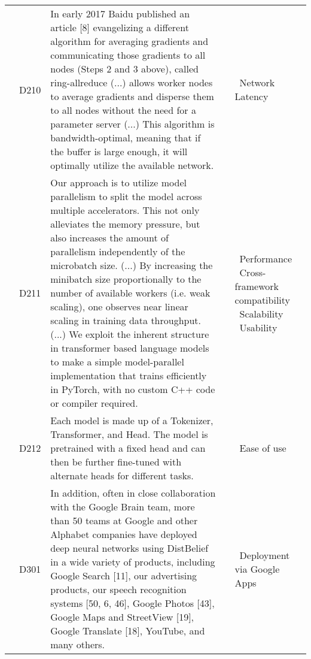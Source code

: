 {\begin{longtable}[H]{|l|p{0.6cm}|p{11.8cm}|p{0.6cm}|p{2cm}|}
         & \label{D210}D210\newline\centering\cite{sergeev_horovod_2018} & In early 2017 Baidu published an article [8] evangelizing a different algorithm for averaging gradients and communicating those gradients to all nodes (Steps 2 and 3 above), called ring-allreduce (...) allows worker nodes to average gradients and disperse them to all nodes without the need for a parameter server (...)  This algorithm is bandwidth-optimal, meaning that if the buffer is large enough, it will optimally utilize the available network.
         & \cite{sergeev_horovod_2018,li_colossal-ai_2023}
	     & \textbullet\ Network Latency \\ \cline{2-5}

         & \label{D211}D211\newline\centering\cite{shoeybi_megatron-lm_2020} & Our approach is to utilize model parallelism to split the model across multiple accelerators. This not only alleviates the memory pressure, but also increases the amount of parallelism independently of the microbatch size. (...) By increasing the minibatch size proportionally to the number of available workers (i.e. weak scaling), one observes near linear scaling in training data throughput. (...) We exploit the inherent structure in transformer based language models to make a simple model-parallel implementation that trains efficiently in PyTorch, with no custom C++ code or compiler required.
         & \cite{shoeybi_megatron-lm_2020,rasley_deepspeed_2020}
	     & \textbullet\ Performance \newline \textbullet\ Cross-framework compatibility \newline \textbullet\ Scalability \newline \textbullet\ Usability \\ \cline{2-5}
         
         & \label{D212}D212\newline\centering\cite{wolf_huggingfaces_2020} & Each model is made up of a Tokenizer, Transformer, and Head. The model is pretrained with a fixed head and can then be further fine-tuned with alternate heads for different tasks.
         & \cite{wolf_huggingfaces_2020,rasley_deepspeed_2020,shoeybi_megatron-lm_2020}
	     & \textbullet\ Ease of use \\ \hline



         & \label{D301}D301\newline\centering\cite{abadi_tensorflow_2016} & In addition, often in close collaboration with the Google Brain team, more than 50 teams at Google and other Alphabet companies have deployed deep neural networks using DistBelief in a wide variety of products, including Google Search [11], our advertising products, our speech recognition systems [50, 6, 46], Google Photos [43], Google Maps and StreetView [19], Google Translate [18], YouTube, and many others.
         & \cite{abadi_tensorflow_2016}
	     & \textbullet\ Deployment via Google Apps \\ \cline{2-5}
         

\end{longtable}}

